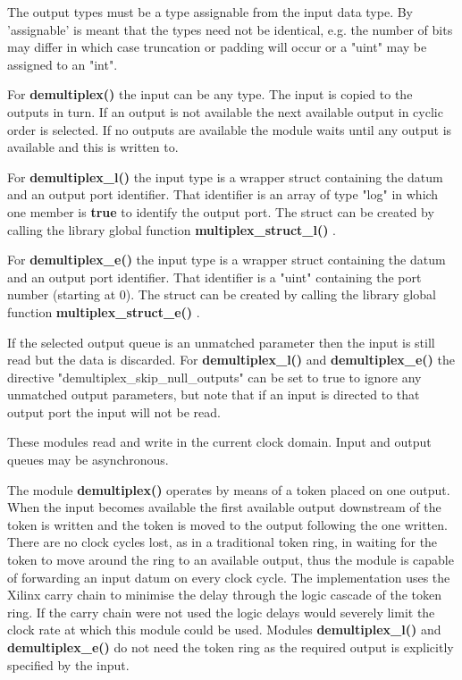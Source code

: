             The output types must be a type assignable from the input data
            type. By 'assignable' is meant that the types need not be identical,
            e.g. the number of bits may differ in which case truncation or
            padding will occur or a "uint" may be assigned to an "int".

            For {\bf demultiplex()} the input can be any type. The input is
            copied to the outputs in turn. If an output is not available the
            next available output in cyclic order is selected. If no outputs
            are available the module waits until any output is available and
            this is written to.

            For {\bf demultiplex\_l()} the input type is a wrapper struct
            containing the datum and an output port identifier. That identifier
            is an array of type "log" in which one member is {\bf true} to
            identify the output port. The struct can be created by calling the
            library global function {\bf multiplex\_struct\_l()}
            .

            For {\bf demultiplex\_e()} the input type is a wrapper struct
            containing the datum and an output port identifier. That identifier
            is  a "uint" containing the port number (starting at 0). The struct
            can be created by calling the library global function {\bf
            multiplex\_struct\_e()} .

            If the selected output queue is an unmatched parameter then the input is
            still read but the data is discarded. For {\bf demultiplex\_l()} and
            {\bf demultiplex\_e()} the directive "demultiplex\_skip\_null\_outputs"
            can be set to true to ignore any unmatched output parameters, but note
            that if an input is directed to that output port the input will not be
            read.

            These modules read and write in the current clock domain.
            Input and output queues may be asynchronous.
            
            The module {\bf demultiplex()} operates by means of a token placed
            on one output. When the input becomes available the first available
            output downstream of the token is written and the token is moved to
            the output following the one written. There are no clock cycles
            lost, as in a traditional token ring, in waiting for the token to
            move around the ring to an available output, thus the module is
            capable of forwarding an input datum on every clock cycle. The
            implementation uses the Xilinx carry chain to minimise the delay
            through the logic cascade of the token ring. If the carry chain were
            not used the logic delays would severely limit the clock rate at
            which this module could be used. Modules {\bf demultiplex\_l()} and
            {\bf demultiplex\_e()} do not need the token ring as the required
            output is explicitly specified by the input.

